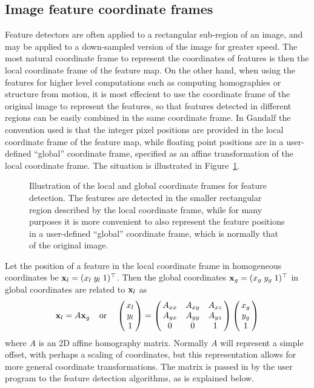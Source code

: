 \subsection{Image feature coordinate frames} \label{feature-coord-sec}
Feature detectors are often applied to a rectangular sub-region of an image,
and may be applied to a down-sampled version of the image for greater speed.
The most natural coordinate frame to represent the coordinates of features
is then the local coordinate frame of the feature map. On the other hand,
when using the features for higher level computations such as computing
homographies or structure from motion, it is most effecient to use the
coordinate frame of the original image to represent the features, so that
features detected in different regions can be easily combined in the same
coordinate frame. In Gandalf the convention used is that the integer
pixel positions are provided in the local coordinate frame of the feature
map, while floating point positions are in a user-defined ``global''
coordinate frame, specified as an affine transformation of the local
coordinate frame. The situation is illustrated in Figure~\ref{local}.
\begin{figure}
 \centerline{}
 \caption{Illustration of the local and global coordinate frames for feature
	detection. The features are detected in the smaller rectangular
	region described by the local coordinate frame, while for
	many purposes it is more convenient to also represent the feature
	positions in a user-defined ``global'' coordinate frame, which is
	normally that of the original image.}
 \label{local}
\end{figure}

Let the position of a feature in the local coordinate frame in homogeneous
coordinates be ${\bf x}_l=(x_l\;y_l\;1)^{\top}$. Then the global coordinates
${\bf x}_g = (x_g\;y_g\;1)^{\top}$ in global coordinates are related to ${\bf x}_l$ as
\[ \xvec_l = A\xvec_g\;\;\;\;\mbox{or}\;\;\;\;
   \beginm{c} x_l \\ y_l \\ 1 \endm =
   \beginm{ccc} A_{xx} & A_{xy} & A_{xz} \\ A_{yx} & A_{yy} & A_{yz} \\
		0 & 0 & 1 \endm
   \beginm{c} x_g \\ y_g \\ 1 \endm
\]
where $A$ is an 2D affine homography matrix. Normally $A$ will represent
a simple offset, with perhaps a scaling of coordinates, but this representation
allows for more general coordinate transformations. The matrix is passed in
by the user program to the feature detection algorithms, as is explained
below.

